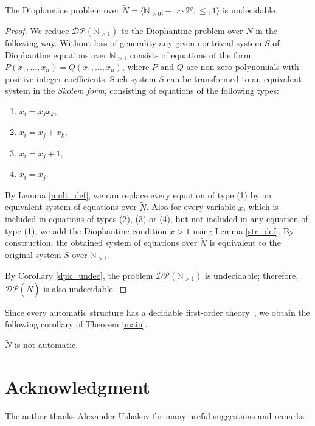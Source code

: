 \documentclass{jgcc} %
\theoremstyle{plain}\newtheorem{satz}[thm]{Satz} %
\begin{document}
\begin{thm} \label{main}
The Diophantine problem over $\widetilde{N} = \langle \mathbb{N}_{>0}; +, x \cdot 2^y, \leq, 1 \rangle$ is undecidable.
\end{thm}
\begin{proof}
We reduce $\mathcal{DP}(\mathbb{N}_{>1})$ to the Diophantine problem over $\widetilde{N}$ in the following way.
Without loss of generality any given nontrivial system $S$ of Diophantine equations over $\mathbb{N}_{>1}$ 
consists of equations of the form $P(x_1, \ldots, x_n) = Q(x_1, \ldots, x_n)$,
where $P$ and $Q$ are non-zero polynomials with positive integer coefficients.
Such system $S$ can be transformed to an equivalent system in the {\it Skolem form}, consisting of equations of
the following types:
\begin{enumerate}
\item $x_i = x_j x_k$,
\item $x_i = x_j + x_k$,
\item $x_i = x_j + 1$,
\item $x_i = x_j$.
\end{enumerate}
By Lemma \ref{mult_def}, we can replace every equation of type (1) by an equivalent system of equations over $\widetilde{N}$.
Also for every variable $x$, which is included in equations of types (2), (3) or (4), but not included in any equation of type (1),
we add the Diophantine condition $x>1$ using Lemma \ref{str_def}. 
By construction, the obtained system of equations over $\widetilde{N}$ is equivalent to the original system $S$ over $\mathbb{N}_{>1}$.

By Corollary \ref{dpk_undec}, the problem $\mathcal{DP}(\mathbb{N}_{>1})$ is undecidable;
therefore, $\mathcal{DP}(\widetilde{N})$ is also undecidable.
\end{proof}

Since every automatic structure has a decidable first-order theory~\cite{KN},
we obtain the following corollary of Theorem \ref{main}.

\begin{cor}
$\widetilde{N}$ is not automatic.
\end{cor}

\section*{Acknowledgment}
  \noindent The author thanks Alexander Ushakov for many useful suggestions and remarks.



\end{document}
